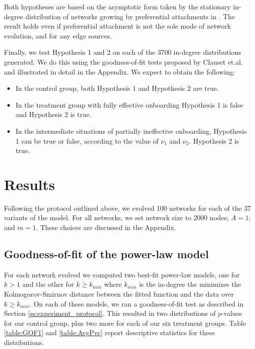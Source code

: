 \documentclass{article}
\begin{document}
Both hypotheses are based on the asymptotic form taken by the stationary in-degree distribution of networks growing by preferential attachments in \cite{dorogovtsev2002evolution}. The result holds even if preferential attachment is not the sole mode of network evolution, and for any edge sources.

Finally, we test Hypothesis 1 and 2 on each of the 3700 in-degree distributions generated. We do this using the goodness-of-fit tests proposed by Clauset et.al. \cite{clauset2009power} and illustrated in detail in the Appendix. We expect to obtain the following:

\begin{itemize}
\item In the control group, both Hypothesis 1 and Hypothesis 2 are true. 
\item In the treatment group with fully effective onboarding Hypothesis 1 is false and Hypothesis 2 is true. 
\item In the intermediate situations of partially ineffective onboarding, Hypothesis 1 can be true or false, according to the value of $\nu_1$ and $\nu_2$. Hypothesis 2 is true.
\end{itemize}



\section{Results}\label{sec:results}
Following the protocol outlined above, we evolved 100 networks for each of the 37 variants of the model. For all networks, we set network size to 2000 nodes; $A = 1$; and $m = 1$. These choices are discussed in the Appendix.

\subsection{Goodness-of-fit of the power-law model} \label{ssec:GOF of power law}

For each network evolved we computed two best-fit power-law models, one for $k > 1$ and the other for $k\geq k_{min}$ where $k_{min}$ is the in-degree the minimizes the Kolmogorov-Smirnov distance between the fitted function and the data over $k \geq k_{min}$. On each of these models, we ran a goodness-of-fit test as described in Section \ref{ss:experiment_protocol}. This resulted in two distributions of $p$-values for our control group, plus two more for each of our six treatment groups. Table \ref{table:GOF1}
 and \ref{table:AvgPvc} report descriptive statistics for these distributions.
\end{document}
